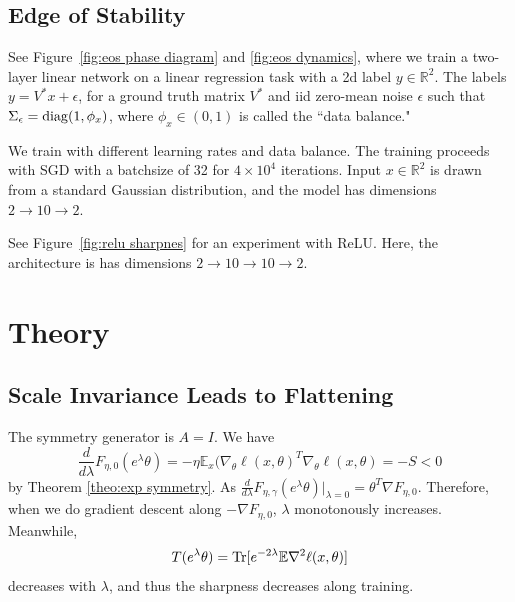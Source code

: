 \documentclass{article}
\theoremstyle{plain}
\newcommand{\Tr}{{\rm Tr}}
\begin{document}
\subsection{Edge of Stability}\label{app sec: eos}
See Figure~\ref{fig:eos phase diagram} and \ref{fig:eos dynamics}, where we train a two-layer linear network on a linear regression task with a 2d label $y\in\mathbb{R}^2$. The labels $y= V^*x +\epsilon$, for a ground truth matrix $V^*$ and iid zero-mean noise $\epsilon$ such that $\Sigma_\epsilon={\rm diag}(1, \phi_x)$, where $\phi_x \in (0, 1)$ is called the ``data balance."

We train with different learning rates and data balance. The training proceeds with SGD with a batchsize of 32 for $4\times 10^4$ iterations. Input $x \in \mathbb{R}^2$ is drawn from a standard Gaussian distribution, and the model has dimensions $2\to 10 \to 2$.
 
See Figure~\ref{fig:relu sharpnes} for an experiment with ReLU. Here, the architecture is has dimensions $2\to 10 \to 10 \to 2$.

\clearpage


\section{Theory}
\subsection{Scale Invariance Leads to Flattening}\label{app sec: scale inv}
The symmetry generator is $A=I$. We have
\begin{equation}
\frac{d}{d\lambda}F_{\eta,0}(e^\lambda\theta)=-\eta\mathbb{E}_x(\nabla_\theta\ell(x,\theta)^T\nabla_\theta\ell(x,\theta) = -S<0%
\end{equation}
by Theorem \ref{theo:exp symmetry}. As $\frac{d}{d\lambda}F_{\eta,\gamma}(e^\lambda\theta)|_{\lambda=0}=\theta^T\nabla F_{\eta,0}$. Therefore, when we do gradient descent along $-\nabla F_{\eta,0}$, $\lambda$ monotonously increases. Meanwhile, 
\begin{equation}
T(e^\lambda\theta)=\Tr[e^{-2\lambda}\mathbb{E}\nabla^2\ell(x,\theta)]
\end{equation}
decreases with $\lambda$, and thus the sharpness decreases along training.
\end{document}
